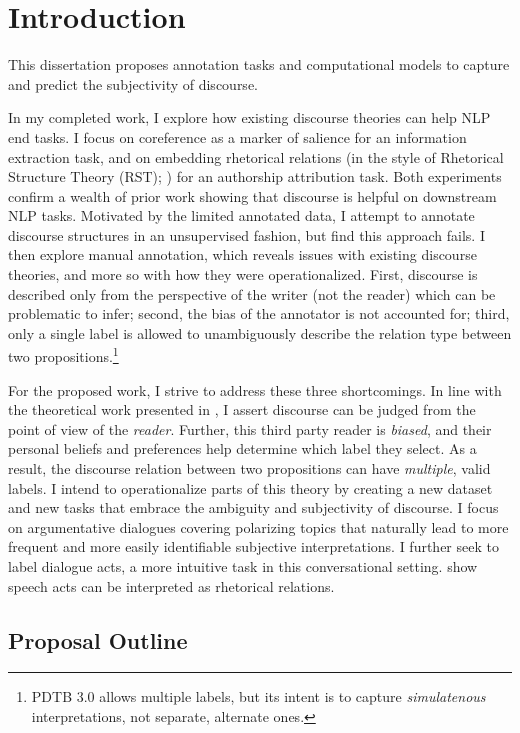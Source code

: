 \chapter{Introduction}
\label{ch:intro}

This dissertation proposes annotation tasks and computational models to capture and predict the subjectivity of discourse.

In my completed work, I explore how existing discourse theories can help NLP end tasks. I focus on coreference as a marker of salience for an information extraction task, and on embedding rhetorical relations (in the style of Rhetorical Structure Theory (RST); \citet{Mann:1988}) for an authorship attribution task. Both experiments confirm a wealth of prior work showing that discourse is helpful on downstream NLP tasks. Motivated by the limited annotated data, I attempt to annotate discourse structures in an unsupervised fashion, but find this approach fails. I then explore manual annotation, which reveals issues with existing discourse theories, and more so with how they were operationalized. First, discourse is described only from the perspective of the writer (not the reader) which can be problematic to infer; second, the bias of the annotator is not accounted for; third, only a single label is allowed to unambiguously describe the relation type between two propositions.\footnote{PDTB 3.0 allows multiple labels, but its intent is to capture \emph{simulatenous} interpretations, not separate, alternate ones.} 

For the proposed work, I strive to address these three shortcomings. In line with the theoretical work presented in \citet{Asher:2018}, I assert discourse can be judged from the point of view of the \emph{reader}. Further, this third party reader is \emph{biased}, and their personal beliefs and preferences help determine which label they select. As a result, the discourse relation between two propositions can have \emph{multiple}, valid labels. I intend to operationalize parts of this theory by creating a new dataset and new tasks that embrace the ambiguity and subjectivity of discourse. I focus on argumentative dialogues covering polarizing topics that naturally lead to more frequent and more easily identifiable subjective interpretations. I further seek to label dialogue acts, a more intuitive task in this conversational setting. \citet{Asher:2001} show speech acts can be interpreted as rhetorical relations.

\section{Proposal Outline}

